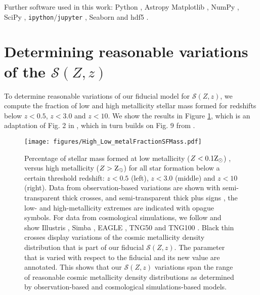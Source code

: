 \documentclass[twocolumn]{aastex631}
\newcommand{\SFRDzZ}{\ensuremath{\mathcal{S}(Z,z)}\xspace}
\begin{document}
Further software used in this work: Python \citep{PythonReferenceManual},  Astropy \citep{astropy:2013,astropy:2018} Matplotlib \citep{2007CSE.....9...90H},  {NumPy} \citep{2020NumPy-Array}, SciPy \citep{2020SciPy-NMeth}, \texttt{ipython$/$jupyter} \citep{2007CSE.....9c..21P, Kluyver2016jupyter},  Seaborn \citep{waskom2020seaborn}  and  {hdf5}   \citep{collette_python_hdf5_2019}. 


\appendix

\section{Determining reasonable variations of the \SFRDzZ \label{app: reasonable var}}
To determine reasonable variations of our fiducial model for \SFRDzZ, we compute the fraction of low and high metallicity stellar mass formed for redshifts below $z<0.5$, $z < 3.0$ and $z<10$. We show the results in Figure \ref{fig: low high Z fraction}, which is an adaptation of Fig. 2 in \cite{Pakmor+2022}, which in turn builds on Fig. 9 from \cite{Chruslinska2019_obs}.

\begin{figure}
\centering
{}
\texttt{[image: figures/High\_Low\_metalFractionSFMass.pdf]}
\caption{Percentage of stellar mass formed at low metallicity ($Z < 0.1 \rm{Z_{\odot}}$) , versus high metallicity ($Z>\rm{Z_{\odot}}$) for all star formation below a certain threshold redshift: $z<0.5$ (left), $z < 3.0$ (middle) and $z<10$ (right). Data from observation-based variations are shown with semi-transparent thick crosses,  \citep[][]{Chruslinska2019_obs} and semi-transparent thick plus signs \citep[][]{Chruslinska+2021}, the low- and high-metallicity extremes are indicated with opague symbols. For data from cosmological simulations, we follow \cite{Pakmor+2022} and show Illustris \citep[][squares]{Vogelsberger+2014}, Simba \citep[][diamonds]{Dave+2019}, EAGLE \citep[][triangles]{Schaye+2015}, TNG50 and TNG100 \citep[][filled and open circles respectively]{FirstResTNG_Springel2018}. Black thin crosses display variations of the cosmic metallicity density distribution that is part of our fiducial \SFRDzZ. The parameter that is varied with respect to the fiducial and its new value are annotated. This shows that our \SFRDzZ variations span the range of reasonable cosmic metallicity density distributions as determined by observation-based and cosmological simulations-based models.
\label{fig: low high Z fraction}
  }
\end{figure}
\end{document}
